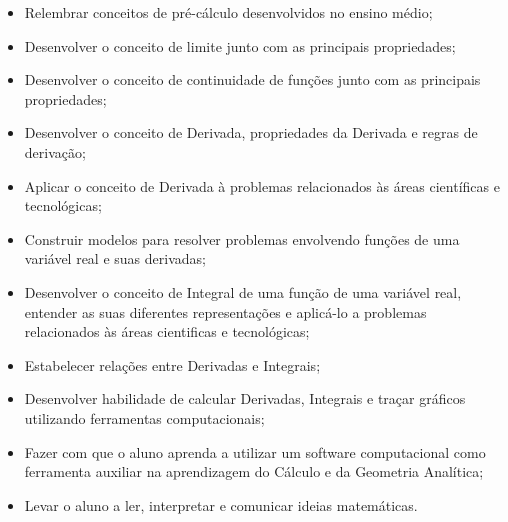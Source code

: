 \begin{itemize}

\item Relembrar conceitos de pré-cálculo desenvolvidos no ensino médio;
\item Desenvolver o conceito de limite junto com as principais propriedades;
\item Desenvolver o conceito de continuidade de funções junto com as principais propriedades;
\item Desenvolver o conceito de Derivada, propriedades da Derivada e regras de derivação;
\item Aplicar o conceito de Derivada à problemas relacionados às áreas científicas e tecnológicas;
\item Construir modelos para resolver problemas envolvendo funções de uma variável real e suas derivadas;
\item Desenvolver o conceito de Integral de uma função de uma variável real, entender as suas diferentes representações e aplicá-lo a problemas relacionados às áreas cientificas e tecnológicas;
\item Estabelecer relações entre Derivadas e Integrais;
\item Desenvolver habilidade de calcular Derivadas, Integrais e traçar gráficos utilizando ferramentas computacionais;
\item Fazer com que o aluno aprenda a utilizar um software computacional como ferramenta auxiliar na aprendizagem do Cálculo e da Geometria Analítica;
\item  Levar o aluno a ler, interpretar e comunicar ideias matemáticas.

\end{itemize} 




 
 
